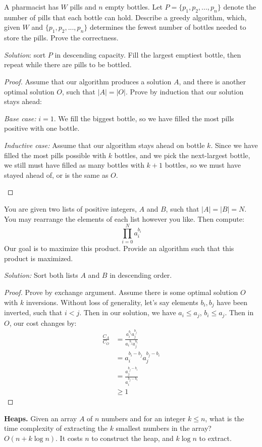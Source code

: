 \documentclass[11pt]{article}
\begin{document}
\begin{exmp}
    A pharmacist has $W$ pills and $n$ empty bottles. Let $P = \{p_1, p_2, ..., p_n \}$ denote the number of pills that each bottle can hold. Describe a greedy algorithm, which, given $W$ and $\{p_1, p_2, ..., p_n\}$ determines the fewest number of bottles needed to store the pills. Prove the correctness.
\end{exmp}
\textit{Solution}: sort $P$ in descending capacity. Fill the largest emptiest bottle, then repeat while there are pills to be bottled.

\begin{proof}
Assume that our algorithm produces a solution $A$, and there is another optimal solution $O$, such that $|A| = |O|$. Prove by induction that our solution stays ahead:
\begin{adjustwidth}{2em}{2em}
\textit{Base case:} $i = 1$. We fill the biggest bottle, so we have filled the most pills positive with one bottle. \par
\textit{Inductive case:} Assume that our algorithm stays ahead on bottle $k$. Since we have filled the most pills possible with $k$ bottles, and we pick the next-largest bottle, we still must have filled as many bottles with $k+1$ bottles, so we must have stayed ahead of, or is the same as $O$.
\end{adjustwidth}
\end{proof}

\begin{exmp}
    You are given two lists of positive integers, $A$ and $B$, such that $|A| = |B| = N$. You may rearrange the elements of each list however you like. Then compute:
    $$ \prod_{i=0}^N a_i^{b_i} $$
    Our goal is to maximize this product. Provide an algorithm such that this product is maximized.
\end{exmp}
\textit{Solution:} Sort both lists $A$ and $B$ in descending order.
\begin{proof}
Prove by exchange argument. Assume there is some optimal solution $O$ with $k$ inversions. Without loss of generality, let's say elements $b_i, b_j$ have been inverted, such that $i < j$. Then in our solution, we have $a_i \leq a_j$, $b_i \leq a_j$. Then in $O$, our cost changes by:
\begin{align*}
    \frac{C_A}{C_O} &= \frac{a_i^{b_i}a_j^{b_j}}{a_i{^{b_j}} a_j^{b_i}} \\
    &=  a_i^{b_i-b_j}a_j^{b_j-b_i} \\
    &=  \frac{a_j^{b_j-b_i}}{a_i^{b_j-b_i}} \\
    &\geq 1
\end{align*}
\end{proof}
\begin{exmp}
    \textbf{Heaps.} Given an array $A$ of $n$ numbers and for an integer $k \leq n$, what is the time complexity of extracting the $k$ smallest numbers in the array? $O(n + k\log n)$. It costs $n$ to construct the heap, and $k \log n$ to extract.
\end{exmp}
\end{document}
